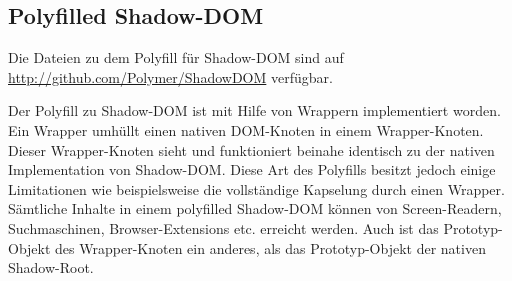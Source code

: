 \newpage
\subsection{Polyfilled Shadow-DOM}
\label{sec:4_Polymer_PShadowDOM}

Die Dateien zu dem Polyfill für Shadow-DOM sind auf \url{http://github.com/Polymer/ShadowDOM} verfügbar.

Der Polyfill zu Shadow-DOM ist mit Hilfe von Wrappern implementiert worden. Ein Wrapper umhüllt einen nativen DOM-Knoten in einem Wrapper-Knoten. Dieser Wrapper-Knoten sieht und funktioniert beinahe identisch zu der nativen Implementation von Shadow-DOM. Diese Art des Polyfills besitzt jedoch einige Limitationen wie beispielsweise die vollständige Kapselung durch einen Wrapper. Sämtliche Inhalte in einem polyfilled Shadow-DOM können von Screen-Readern, Suchmaschinen, Browser-Extensions etc. erreicht werden. Auch ist das Prototyp-Objekt des Wrapper-Knoten ein anderes, als das Prototyp-Objekt der nativen Shadow-Root.